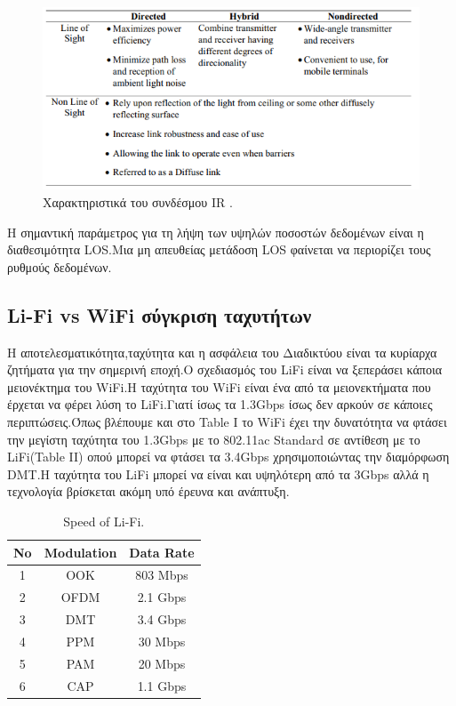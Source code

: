 \documentclass[conference]{IEEEtran}
\begin{document}
\begin{itemize}
\begin{figure}[h]
  \includegraphics[width=\linewidth]{14.png}
  \caption{Χαρακτηριστικά του συνδέσμου  IR .} 
\end{figure} 
Η σημαντική παράμετρος για τη λήψη των υψηλών ποσοστών δεδομένων είναι η διαθεσιμότητα LOS.Μια μη απευθείας  μετάδοση LOS φαίνεται  να περιορίζει τους  ρυθμούς δεδομένων.


\end{itemize}
\subsection{Li-Fi vs WiFi σύγκριση ταχυτήτων}
Η αποτελεσματικότητα,ταχύτητα και η ασφάλεια του Διαδικτύου είναι τα κυρίαρχα ζητήματα για  την σημερινή εποχή.Ο σχεδιασμός του LiFi είναι να ξεπεράσει κάποια  μειονέκτημα του WiFi.Η ταχύτητα του WiFi είναι ένα από τα μειονεκτήματα που έρχεται να φέρει λύση το LiFi.Γιατί ίσως τα 1.3Gbps  ίσως δεν αρκούν σε κάποιες περιπτώσεις.Όπως βλέπουμε και στο Table I το WiFi έχει την δυνατότητα να φτάσει την μεγίστη ταχύτητα του 1.3Gbps με το 802.11ac Standard σε αντίθεση με το LiFi(Table II)  οπού μπορεί να φτάσει τα 3.4Gbps χρησιμοποιώντας  την διαμόρφωση DMT.Η ταχύτητα του LiFi μπορεί να είναι και  υψηλότερη από τα 3Gbps αλλά  η τεχνολογία βρίσκεται ακόμη υπό  έρευνα και ανάπτυξη.


\begin{table}[H]
\large
\caption{Speed of Li-Fi.\cite{b9}} %
\centering %
\begin{tabular}{c c c} %
\hline\hline %
No & Modulation & Data Rate  \\ [0.5ex] %
\hline %
1 & OOK & 803 Mbps \\ %
2 & OFDM & 2.1 Gbps \\
3 & DMT & 3.4 Gbps  \\
4 & PPM & 30 Mbps  \\
5 & PAM & 20 Mbps  \\
6 & CAP & 1.1 Gbps  \\ [1ex] %
\hline %
\end{tabular}
\label{table:nonlin} %
\end{table}
\end{document}
